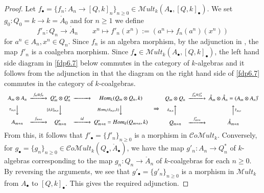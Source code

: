 \documentclass[10pt, colorlinks]{article}
\numberwithin{equation}{section} \DeclareMathSizes{2}{10}{12}{13}
\begin{document}
    
    \begin{proof}
        Let $f_\bullet=\{f_n:A_n\longrightarrow [Q,k]_n\}_{n\geq 0}\in \mathscr Mult_k(A_\bullet, [Q,k]_\bullet)$. We set $g_0:Q_0=k\longrightarrow k=\mathring{A}_0$ and for $n\geq 1$ we define 
        \begin{equation}
            f'_n: Q_n\longrightarrow \mathring{A}_n\qquad x^n\mapsto f'_n(x^n):=( a^n\longmapsto f_n(a^n)(x^n))
        \end{equation} for $a^n\in A_n,x^n\in Q_n$. Since $f_n$ is an algebra morphism, by the adjunction in \cite[Theorem 6.0.5]{SW}, the map $f'_n$ is a coalgebra morphism. Since $
        f_\bullet\in \mathscr Mult_k(A_\bullet, [Q,k]_\bullet)$, the left hand side diagram in \eqref{fdp6.7} below commutes in the category of $k$-algebras and it follows from  the adjunction in \cite[Theorem 6.0.5]{SW} that the diagram on the right hand side of \eqref{fdp6.7}    commutes in the category of $k$-coalgebras.
        \begin{equation}\label{fdp6.7}
        \begin{array}{ccc}
        \begin{CD}
        A_m\otimes A_n @>f_m\otimes f_n>> Q_m^*\otimes Q_n^* @>>> Hom_k(Q_m\otimes Q_n,k)\\
        @V\tau_{m,n}VV @V[\delta,k]_{m,n}VV @VHom_k(\delta_{m,n},k)VV \\
        A_{m+n} @>f_{m+n}>> Q_{m+n}^*@>id>> Q_{m+n}^*=Hom_k(Q_{m+n},k)\\
        \end{CD} & \Rightarrow & 
        \begin{CD}
        Q_m\otimes Q_n @>f'_m\otimes f'_n>> \mathring{A}_m\otimes \mathring{A}_n =(A_m\otimes A_n)\mathring{}\\
        @A\delta_{m,n}AA @AA\mathring{\tau}_{m,n}A \\
        Q_{m+n} @>f'_{m+n}>> \mathring{A}_{m+n}\\
        \end{CD} \\
        \end{array}
        \end{equation}
      From this, it follows that $f'_\bullet=\{f'_n\}_{n\geq 0} $ is a morphism in $\mathcal Co\mathscr Mult_k$. 
        Conversely, for  $g_\bullet=\{g_n\}_{n\geq 0}\in \mathcal Co\mathscr Mult_k(Q_\bullet,\mathring{A}_\bullet)$, we have the map $g'_n:A_n\longrightarrow Q_n^*$ of $k$-algebras  corresponding to the map $g_n:Q_n\longrightarrow \mathring{A}_n$ of $k$-coalgebras for each $n\geq 0$. By reversing the arguments, we see that $g'_\bullet=\{g'_n\}_{n\geq 0}$ is  a morphism in $\mathscr Mult_k$ from $A_\bullet$ to $[Q,k]_\bullet$. This gives the required adjunction.
    \end{proof}
\end{document}
